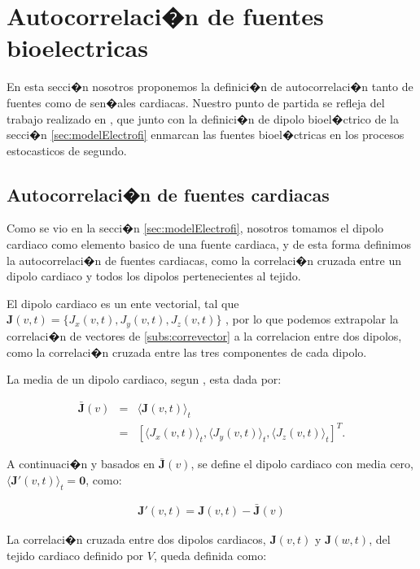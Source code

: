 \section{Autocorrelaci�n de fuentes bioelectricas}

En esta secci�n nosotros proponemos la definici�n de autocorrelaci�n tanto de
fuentes como de sen�ales cardiacas. Nuestro punto de partida se refleja del
trabajo realizado en \cite{Requena08}, que junto con la
definici�n de dipolo bioel�ctrico de la secci�n \ref{sec:modelElectrofi}
enmarcan las fuentes bioel�ctricas en los procesos estocasticos de segundo.


\subsection{Autocorrelaci�n  de fuentes cardiacas}

Como se vio en la secci�n \ref{sec:modelElectrofi}, nosotros tomamos el dipolo
cardiaco como elemento basico de una fuente cardiaca, y de esta forma definimos
la autocorrelaci�n de fuentes cardiacas, como la correlaci�n cruzada entre un
dipolo cardiaco y todos los dipolos pertenecientes al tejido.

El dipolo cardiaco es un ente  vectorial, tal que $\mathbf{J}(v,t)={\{ J_x(v,t),
J_y(v,t), J_z(v,t) \}}$ \cite{Malmivuo95}, por lo que podemos extrapolar la
correlaci�n de vectores de  \ref{subs:correvector} a la correlacion entre dos
dipolos,  como la correlaci�n cruzada entre las tres componentes de cada dipolo.

La media de un dipolo cardiaco, segun \cite{Papoulis91},  esta dada por:
  
 \begin{eqnarray}\label{eq:average_dipole}
 \bar{\mathbf{J}}(v)&=&\langle\mathbf{J}(v,t)\rangle_t  \nonumber \\
	&=& [\langle J_x(v,t)\rangle_t, \langle J_y(v,t)\rangle_t, \langle J_z(v,t)\rangle_t]^T. 
 \end{eqnarray}

A continuaci�n  y basados en  $\bar{\mathbf{J}}(v)$, se define el dipolo
cardiaco con media cero, $\langle\mathbf{J'}(v,t)\rangle_t=\mathbf{0}$, como:


\begin{eqnarray}\label{eq:zero_average_dipole}
	\mathbf{J'}(v,t)=\mathbf{J}(v,t)-\bar{\mathbf{J}}(v)
\end{eqnarray}

La correlaci�n cruzada entre dos dipolos cardiacos, $\mathbf{J}(v,t)$ y 
$\mathbf{J}(w,t)$, del tejido cardiaco definido por $V$, queda definida como:

